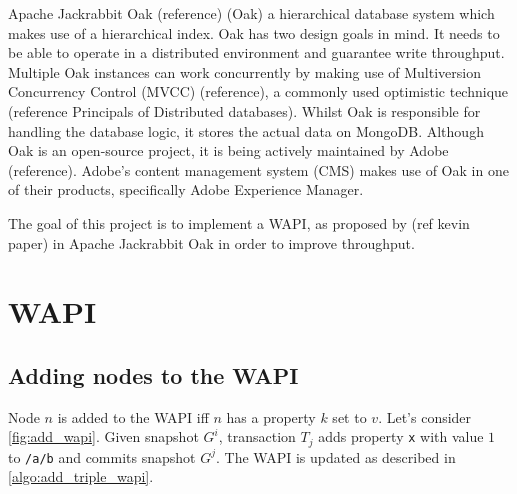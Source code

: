 \documentclass[abstracton,12pt]{scrreprt}
\begin{document}
Apache Jackrabbit Oak (reference) (Oak) a hierarchical database system which makes use of a hierarchical index. 
Oak has two design goals in mind.
It needs to be able to operate in a distributed environment and guarantee write throughput.
Multiple Oak instances can work concurrently by making use of Multiversion Concurrency Control (MVCC) (reference), a commonly used optimistic technique (reference Principals of Distributed databases).
Whilst Oak is responsible for handling the database logic, it stores the actual data on MongoDB.
Although Oak is an open-source project, it is being actively maintained by Adobe (reference).
Adobe's content management system (CMS) makes use of Oak in one of their products, specifically Adobe Experience Manager.

The goal of this project is to implement a WAPI, as proposed by (ref kevin paper) in Apache Jackrabbit Oak in order to improve throughput.

\chapter{WAPI}

\section{Adding nodes to the WAPI}

Node $n$ is added to the WAPI iff $n$ has a property $k$ set to $v$.
Let's consider \cref{fig:add_wapi}.
Given snapshot $G^i$, transaction $T_j$ adds property \texttt{x} with value $1$ to \texttt{/a/b} and commits snapshot $G^j$.
The WAPI is updated as described in \cref{algo:add_triple_wapi}.
\end{document}
